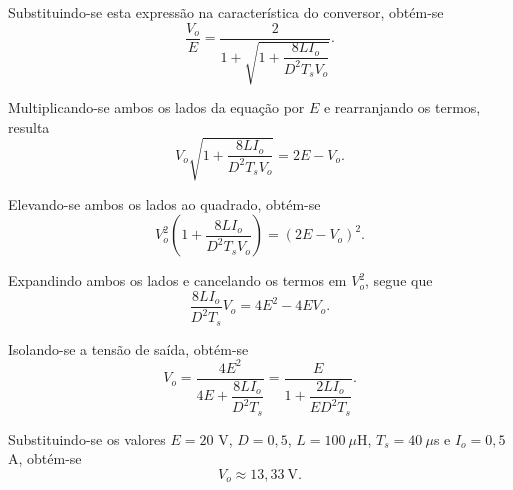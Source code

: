 Substituindo-se esta expressão na característica do conversor, obtém-se
\begin{equation*}
	\frac{V_o}{E}
	=
	\frac{2}
	{1+\sqrt{1+\dfrac{8LI_o}{D^2T_sV_o}}}.
\end{equation*}

Multiplicando-se ambos os lados da equação por $E$ e rearranjando os termos, resulta
\begin{equation*}
	V_o\sqrt{1+\frac{8LI_o}{D^2T_sV_o}}
	=
	2E-V_o.
\end{equation*}

Elevando-se ambos os lados ao quadrado, obtém-se
\begin{equation*}
	V_o^2
	\left(
	1+\frac{8LI_o}{D^2T_sV_o}
	\right)
	=
	(2E-V_o)^2.
\end{equation*}

Expandindo ambos os lados e cancelando os termos em $V_o^2$, segue que
\begin{equation*}
	\frac{8LI_o}{D^2T_s}V_o
	=
	4E^2-4EV_o.
\end{equation*}

Isolando-se a tensão de saída, obtém-se
\begin{equation*}
	V_o
	=
	\frac{4E^2}
	{4E+\dfrac{8LI_o}{D^2T_s}}
	=
	\frac{E}
	{1+\dfrac{2LI_o}{ED^2T_s}}.
\end{equation*}

Substituindo-se os valores $E=20$ V, $D=0{,}5$, $L=100~\mu$H, $T_s=40~\mu$s e $I_o=0{,}5$ A, obtém-se
\begin{equation*}
	V_o \approx 13{,}33~\text{V}.
\end{equation*}